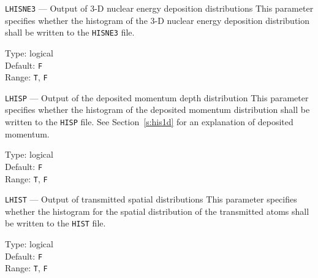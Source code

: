 \begin{keydescription}{\texttt{LHISNE3} --- Output of 3-D nuclear energy deposition distributions}
%
  This parameter specifies whether the histogram of the 3-D nuclear energy
  deposition distribution shall be written to the \texttt{HISNE3} file.
  \begin{keytab}
    Type:    \> logical \\
    Default: \> \texttt{F} \\
    Range:   \> \texttt{T}, \texttt{F} 
  \end{keytab}
\end{keydescription}

\begin{keydescription}{\texttt{LHISP} --- Output of the deposited momentum depth distribution}
%
  This parameter specifies whether the histogram of the deposited momentum distribution shall 
  be written to the \texttt{HISP} file. See Section~\ref{s:his1d} for an explanation of 
  deposited momentum. 
  \begin{keytab}
    Type:    \> logical \\
    Default: \> \texttt{F} \\
    Range:   \> \texttt{T}, \texttt{F} 
  \end{keytab}
\end{keydescription}

\begin{keydescription}{\texttt{LHIST} --- Output of transmitted spatial distributions}
%
  This parameter specifies whether the histogram for the spatial distribution of the 
  transmitted atoms shall be written to the \texttt{HIST} file.
  \begin{keytab}
    Type:    \> logical \\
    Default: \> \texttt{F} \\
    Range:   \> \texttt{T}, \texttt{F} 
  \end{keytab}
\end{keydescription}

